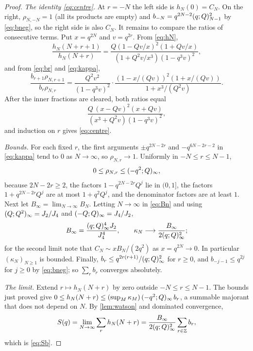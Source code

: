 \begin{proof}
\emph{The identity \eqref{eq:centre}.} At $r=-N$ the left side is
$h_N(0)=C_N$. On the right, $\rho_{N,-N}=1$ (all its products are empty) and
$b_{-N}=q^{2N-2}(q;Q)_{N-1}^2$ by \eqref{eq:bneg}, so the right side is
also $C_N$. It remains to compare the ratios of consecutive terms. Put
$x=q^{2N}$ and $v=q^{2r}$. From \eqref{eq:hN},
\[
\frac{h_N(N+r+1)}{h_N(N+r)}=\frac{Q(1-Qv/x)^2(1+Qv/x)}{(1+Q^2v/x^3)(1-q^3v)^2},
\]
and from \eqref{eq:br} and \eqref{eq:kappa},
\[
\frac{b_{r+1}\rho_{N,r+1}}{b_r\rho_{N,r}}
=\frac{Q^2v^2}{(1-q^3v)^2}\cdot\frac{(1-x/(Qv))^2(1+x/(Qv))}{1+x^3/(Q^2v)} .
\]
After the inner fractions are cleared, both ratios equal
\[
\frac{Q\,(x-Qv)^2(x+Qv)}{(x^3+Q^2v)(1-q^3v)^2},
\]
and induction on $r$ gives \eqref{eq:centre}.

\emph{Bounds.} For each fixed $r$, the first arguments $\pm q^{2N-2r}$ and
$-q^{6N-2r-2}$ in \eqref{eq:kappa} tend to $0$ as $N\to\infty$, so
$\rho_{N,r}\to1$. Uniformly in $-N\le r\le N-1$,
\[
0\le\rho_{N,r}\le(-q^2;Q)_{\infty},
\]
because $2N-2r\ge2$, the factors $1-q^{2N-2r}Q^j$ lie in $(0,1]$, the factors
$1+q^{2N-2r}Q^j$ are at most $1+q^2Q^j$, and the denominator factors are at
least $1$. Next let $B_\infty=\lim_{N\to\infty}B_N$. Letting $N\to\infty$ in
\eqref{eq:Bn} and using $(Q;Q^2)_{\infty}=J_2/J_4$ and
$(-Q;Q)_{\infty}=J_4/J_2$,
\[
B_\infty=\frac{(q;Q)_{\infty}^4J_2}{J_4^4},\qquad
\kappa_N\longrightarrow\frac{B_\infty}{2(q;Q)_{\infty}^2};
\]
for the second limit note that $C_N\sim xB_N/(2q^2)$ as $x=q^{2N}\to0$. In
particular $(\kappa_N)_{N\ge1}$ is bounded. Finally, $b_r\le
q^{2r(r+1)}/(q;Q)_{\infty}^2$ for $r\ge0$, and $b_{-j-1}\le q^{2j}$ for
$j\ge0$ by \eqref{eq:bneg}; so $\sum_r b_r$ converges absolutely.

\emph{The limit.} Extend $r\mapsto h_N(N+r)$ by zero outside
$-N\le r\le N-1$. The bounds just proved give
$0\le h_N(N+r)\le(\sup_M\kappa_M)\,(-q^2;Q)_{\infty}\,b_r$, a summable
majorant that does not depend on $N$. By \cref{lem:watson} and dominated
convergence,
\[
S(q)=\lim_{N\to\infty}\sum_{r}h_N(N+r)=\frac{B_\infty}{2(q;Q)_{\infty}^2}\sum_{r\in\mathbb{Z}}b_r,
\]
which is \eqref{eq:Sb}.
\end{proof}

